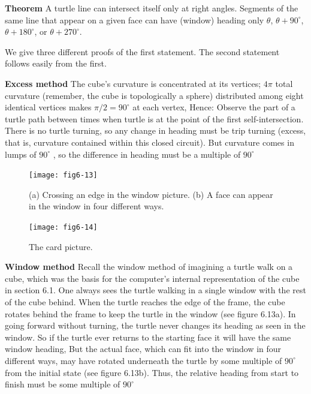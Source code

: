 \documentclass{book}
\begin{document}
\textbf{Theorem} A turtle line can intersect itself only at right angles. Segments
of the same line that appear on a given face can have (window) heading
only $\theta$, $\theta + 90^{\circ}$, $\theta + 180^{\circ}$, or $\theta + 270^{\circ}$.


We give three different proofs of the first statement. The second statement follows easily from the first.

\textbf{Excess method} The cube's curvature is concentrated at its vertices; $4 \pi$
total curvature (remember, the cube is topologically a sphere) distributed
among eight identical vertices makes $\pi / 2 = 90^{\circ}$ at each vertex, Hence:
Observe the part of a turtle path between times when turtle is at the
point of the first self-intersection. There is no turtle turning, so any
change in heading must be trip turning (excess, that is, curvature contained within this closed circuit). But curvature comes in lumps of $90^{\circ}$ ,
so the difference in heading must be a multiple of $90^{\circ}$

\begin{figure}
\begin{center}
\texttt{[image: fig6-13]}
\caption{(a) Crossing an edge in the window picture. (b) A face can appear in the window in four different ways.}
\end{center}
\end{figure}

\begin{figure}
\begin{center}
\texttt{[image: fig6-14]}
\caption{The card picture.}
\end{center}
\end{figure}

\textbf{Window method} Recall the window method of imagining a turtle walk
on a cube, which was the basis for the computer's internal representation
of the cube in section 6.1. One always sees the turtle walking in a single
window with the rest of the cube behind. When the turtle reaches the
edge of the frame, the cube rotates behind the frame to keep the turtle
in the window (see figure 6.13a). In going forward without turning, the
turtle never changes its heading as seen in the window. So if the turtle
ever returns to the starting face it will have the same window heading,
But the actual face, which can fit into the window in four different ways,
may have rotated underneath the turtle by some multiple of $90^{\circ}$ from
the initial state (see figure 6.13b). Thus, the relative heading from start
to finish must be some multiple of $90^{\circ}$ 
\end{document}
